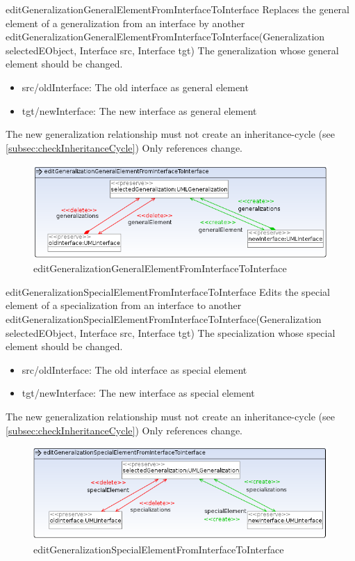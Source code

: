 \op
{editGeneralizationGeneralElementFromInterfaceToInterface}
{Replaces the general element of a generalization from an interface by
another}
{editGeneralizationGeneralElementFromInterfaceToInterface(Generalization
selectedEObject, Interface src, Interface tgt)}
{The generalization whose general element should be changed.} {
\begin{itemize}
 \item src/oldInterface: The old interface as general element
 \item tgt/newInterface: The new interface as general element
\end{itemize}
}
{The new generalization relationship must not create an inheritance-cycle (see
\ref{subsec:checkInheritanceCycle})}
{Only references change.}
\begin{figure}[H]
  \centering
  \includegraphics[width=1.0\textwidth]{pics/editGeneralizationGeneralElementFromInterfaceToInterface.png}
  \caption{editGeneralizationGeneralElementFromInterfaceToInterface}
  \label{editGeneralizationGeneralElementFromInterfaceToInterface}
\end{figure}
\op
{editGeneralizationSpecialElementFromInterfaceToInterface}
{Edits the special element of a specialization from an interface to
another}
{editGeneralizationSpecialElementFromInterfaceToInterface(Generalization
selectedEObject, Interface src, Interface tgt)}
{The specialization whose special element should be changed.} {
\begin{itemize}
 \item src/oldInterface: The old interface as special element
 \item tgt/newInterface: The new interface as special element
\end{itemize}
}
{The new generalization relationship must not create an inheritance-cycle (see
\ref{subsec:checkInheritanceCycle})}
{Only references change.}
\begin{figure}[H]
  \centering
  \includegraphics[width=1.0\textwidth]{pics/editGeneralizationSpecialElementFromInterfaceToInterface.png}
  \caption{editGeneralizationSpecialElementFromInterfaceToInterface}
  \label{editGeneralizationSpecialElementFromInterfaceToInterface}
\end{figure}

